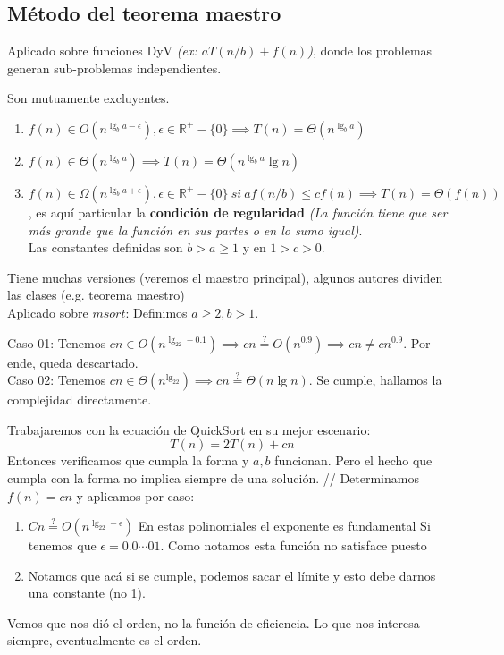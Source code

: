 \subsection{Método del teorema maestro}
Aplicado sobre funciones DyV \textit{(ex: $aT(n/b)+f(n)$)}, donde los problemas generan sub-problemas independientes.
\begin{theorem}[Casos]
	Son mutuamente excluyentes.
	\begin{enumerate}
		\item $f(n)\in O(n^{\lg_b{a-\epsilon}}),
			      \epsilon\in\mathbb{R}^{+}-\{0\}
			      \implies T(n)=\Theta(n^{\lg_ba})$
		\item $f(n)\in \Theta(n^{\lg_ba})
			      \implies T(n)=\Theta(n^{\lg_ba}\lg n)$
		\item $f(n)\in \Omega(n^{\lg_b{a+\epsilon}}),
			      \epsilon\in\mathbb{R}^{+}-\{0\}~si~af(n/b)\le cf(n)
			      \implies T(n)=\Theta(f(n))$, es aquí particular la \textbf{condición de regularidad} \textit{(La función tiene que ser más grande que la función en sus partes o en lo sumo igual)}.\\
		      Las constantes definidas son $b>a\ge1$ y en $1>c>0$.
	\end{enumerate}
\end{theorem}

\begin{example}
	Tiene muchas versiones (veremos el maestro principal), algunos autores dividen las clases (e.g. teorema maestro)
	\\
	Aplicado sobre $msort$:
	Definimos $a\ge2, b>1$.


	Caso 01: Tenemos $cn\in O(n^{\lg_22-0.1})\implies cn \stackrel?= O(n^{0.9})
		\implies cn\ne cn^{0.9}$. Por ende, queda descartado.\\
	Caso 02: Tenemos $cn\in \Theta(n^{\lg_22})\implies cn \stackrel?= \Theta(n\lg n)$. Se cumple, hallamos la complejidad directamente.
\end{example}

\begin{example}
	Trabajaremos con la ecuación de QuickSort en su mejor escenario:
	$$ T(n)=2T(n)+cn $$
	Entonces verificamos que cumpla la forma y $a, b$ funcionan. Pero el hecho que cumpla con la forma no implica siempre de una solución.
	//
	Determinamos $f(n)=cn$ y aplicamos por caso:
	\begin{enumerate}
		\item $Cn\stackrel?=O(n^{\lg_22-\epsilon})$
		      En estas polinomiales el exponente es fundamental
		      Si tenemos que $\epsilon=0.0\cdots01$. Como notamos esta función no satisface puesto

		\item Notamos que acá si se cumple, podemos sacar el límite y esto debe darnos una constante (no 1).
	\end{enumerate}
	Vemos que nos dió el orden, no la función de eficiencia. Lo que nos interesa siempre, eventualmente es el orden.

\end{example}



